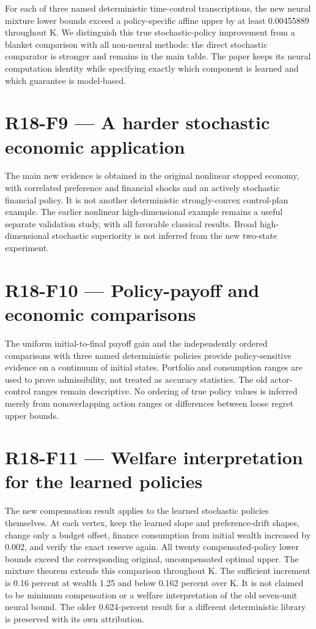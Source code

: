 \documentclass[ecta]{econsocart}
\theoremstyle{remark}
\begin{document}
For each of three named deterministic time-control transcriptions, the new neural mixture lower bounds exceed a policy-specific affine upper by at least 0.00455889 throughout K. We distinguish this true stochastic-policy improvement from a blanket comparison with all non-neural methods: the direct stochastic comparator is stronger and remains in the main table. The paper keeps its neural computation identity while specifying exactly which component is learned and which guarantee is model-based.

\section{R18-F9 — A harder stochastic economic application}
The main new evidence is obtained in the original nonlinear stopped economy, with correlated preference and financial shocks and an actively stochastic financial policy. It is not another deterministic strongly-convex control-plan example. The earlier nonlinear high-dimensional example remains a useful separate validation study, with all favorable classical results. Broad high-dimensional stochastic superiority is not inferred from the new two-state experiment.

\section{R18-F10 — Policy-payoff and economic comparisons}
The uniform initial-to-final payoff gain and the independently ordered comparisons with three named deterministic policies provide policy-sensitive evidence on a continuum of initial states. Portfolio and consumption ranges are used to prove admissibility, not treated as accuracy statistics. The old actor-control ranges remain descriptive. No ordering of true policy values is inferred merely from nonoverlapping action ranges or differences between loose regret upper bounds.

\section{R18-F11 — Welfare interpretation for the learned policies}
The new compensation result applies to the learned stochastic policies themselves. At each vertex, keep the learned slope and preference-drift shapes, change only a budget offset, finance consumption from initial wealth increased by 0.002, and verify the exact reserve again. All twenty compensated-policy lower bounds exceed the corresponding original, uncompensated optimal upper. The mixture theorem extends this comparison throughout K. The sufficient increment is 0.16 percent at wealth 1.25 and below 0.162 percent over K. It is not claimed to be minimum compensation or a welfare interpretation of the old seven-unit neural bound. The older 0.624-percent result for a different deterministic library is preserved with its own attribution.
\end{document}

